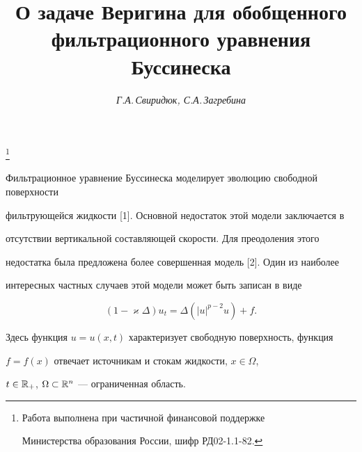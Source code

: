 \author{\it Г.А.\,Свиридюк, С.А.\,Загребина }




\title{О задаче Веригина для обобщенного фильтрационного уравнения Буссинеска}


\thanks{Работа выполнена при частичной финансовой поддержке


Министерства образования России, шифр РД02-1.1-82.}





\date{}




\pagestyle{plain} %







\maketitle


\label{begin}











Фильтрационное уравнение Буссинеска моделирует эволюцию свободной поверхности


фильтрующейся жидкости [1]. Основной недостаток этой модели заключается в


отсутствии вертикальной составляющей скорости. Для преодоления этого


недостатка была предложена более совершенная модель [2]. Один из наиболее


интересных частных случаев этой модели может быть записан в виде


\begin{equation}


(1-\varkappa\Delta) u_t = \Delta (|u|^{p-2} u) + f.\tag{0.1}


\end{equation}


Здесь функция $u = u(x,t)$ характеризует свободную поверхность, функция


$f = f(x)$ отвечает источникам и стокам жидкости, $x\in\Omega$,


$t\in{\Bbb R}_+$, $\Omega\subset{\Bbb R}^n$ --- ограниченная область.


